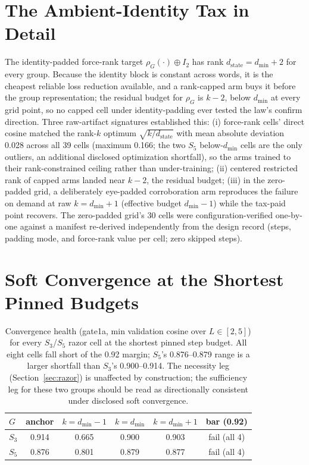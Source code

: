 \documentclass[mlabstract,onecolumn]{jmlr}
\newcommand{\dmin}{d_{\min}}
\newcommand{\dstate}{d_{\mathrm{state}}}
\begin{document}
\section{The Ambient-Identity Tax in Detail}
\label{app:damb}

The identity-padded force-rank target
$\rho_G(\cdot) \oplus I_2$ has rank $\dstate = \dmin + 2$ for every
group. Because the identity block is constant across words, it is the
cheapest reliable loss reduction available, and a rank-capped arm buys it
before the group representation; the residual budget for $\rho_G$ is
$k - 2$, below $\dmin$ at every grid point, so no capped cell under
identity-padding ever tested the law's confirm direction. Three raw-artifact
signatures established this: (i) force-rank cells' direct cosine matched
the rank-$k$ optimum $\sqrt{k/\dstate}$ with mean absolute deviation 0.028
across all 39 cells (maximum 0.166; the two $S_5$ below-$\dmin$ cells are
the only outliers, an additional disclosed optimization shortfall), so the
arms trained to their rank-constrained ceiling rather than under-training;
(ii) centered restricted rank of capped arms landed near $k - 2$, the
residual budget; (iii) in the zero-padded grid, a deliberately
eye-padded corroboration arm reproduces the failure on demand at raw
$k = \dmin{+}1$ (effective budget $\dmin{-}1$) while the tax-paid point
recovers.
The zero-padded grid's 30 cells were configuration-verified one-by-one
against a manifest re-derived independently from the design record (steps,
padding mode, and force-rank value per cell; zero skipped steps).

\section{Soft Convergence at the Shortest Pinned Budgets}
\label{app:gate1a}

\begin{table}[h]
\centering
\small
\begin{tabular}{lccccc}
\toprule
$G$ & anchor & $k{=}\dmin{-}1$ & $k{=}\dmin$ & $k{=}\dmin{+}1$ & bar (0.92) \\
\midrule
$S_3$ & 0.914 & 0.665 & 0.900 & 0.903 & fail (all 4) \\
$S_5$ & 0.876 & 0.801 & 0.879 & 0.877 & fail (all 4) \\
\bottomrule
\end{tabular}
\caption{Convergence health (gate1a, min validation cosine over
$L \in [2, 5]$) for every $S_3$/$S_5$ razor cell at the shortest pinned
step budget. All eight cells fall short of the 0.92 margin; $S_5$'s
0.876--0.879 range is a larger shortfall than $S_3$'s 0.900--0.914. The
necessity leg (Section~\ref{sec:razor}) is unaffected by construction; the
sufficiency leg for these two groups should be read as directionally
consistent under disclosed soft convergence.}
\label{tab:gate1a}
\end{table}
\end{document}
